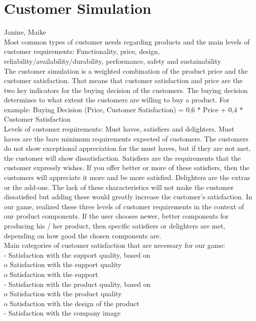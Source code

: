 \documentclass[11pt,titlepage,oneside,openany]{book}
\begin{document}
\section{Customer Simulation}
\label{sec:customsim}
Janine, Maike \\
Most common types of customer needs regarding products and the main levels of customer requirements: Functionality, price, design, reliability/availability/durability, performance, safety and sustainability
\\
The customer simulation is a weighted combination of the product price and the customer satisfaction. 
That means that customer satisfaction and price are the two key indicators for the buying decision of the customers. The buying decision determines to what extent the customers are willing to buy a product. 
For example: Buying Decision (Price, Customer Satisfaction) = 0,6 * Price + 0,4 * Customer Satisfaction
\\
 Levels of customer requirements: Must haves, satisfiers and delighters. Must haves are the bare minimum requirements expected of customers. The customers do not show exceptional appreciation for the must haves, but if they are not met, the customer will show dissatisfaction. Satisfiers are the requirements that the customer expressly wishes. If you offer better or more of these satisfiers, then the customers will appreciate it more and be more satisfied. Delighters are the extras or the add-ons. The lack of these characteristics will not make the customer dissatisfied but adding these would greatly increase the customer's satisfaction. In our game, realized these three levels of customer requirements in the context of our product components. If the user chooses newer, better components for producing his / her product, then specific satisfiers or delighters are met, depending on how good the chosen components are.
 \\
 Main categories of customer satisfaction that are necessary for our game: \\
- Satisfaction with the support quality, based on \\
    o Satisfaction with the support quality \\
    o Satisfaction with the support \\
- Satisfaction with the product quality, based on \\
    o Satisfaction with the product quality \\
    o Satisfaction with the design of the product \\ 
- Satisfaction with the company image \\
\\
\end{document}
